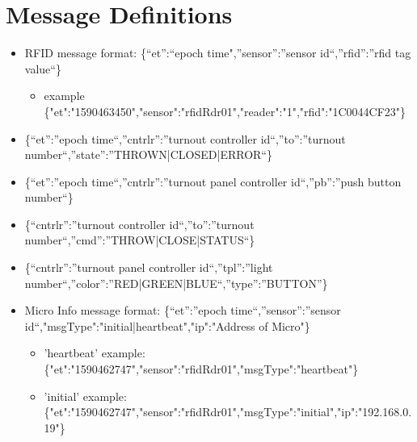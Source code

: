 \section{Message Definitions}
\begin{itemize}
\item \ac{RFID} message format: \{“et”:“epoch time",”sensor”:”sensor id“,”rfid”:”rfid tag value“\}
\begin{itemize}
\item example \{"et":"1590463450","sensor":"rfidRdr01","reader":"1","rfid":"1C0044CF23"\}
\end{itemize}
\item\{“et”:”epoch time“,”cntrlr”:”turnout controller id“,”to”:”turnout number“,”state”:”THROWN|CLOSED|ERROR“\}
\item\{“et”:”epoch time“,”cntrlr”:”turnout panel controller id“,”pb”:”push button number“\} 
\item\{“cntrlr”:”turnout controller id“,”to”:”turnout number“,”cmd”:”THROW|CLOSE|STATUS“\}
\item\{“cntrlr”:”turnout panel controller id“,”tpl”:”light number“,”color”:”RED|GREEN|BLUE“,”type”:”BUTTON”\}
\item Micro Info message format: \{“et”:”epoch time“,”sensor”:”sensor id“,"msgType":"initial|heartbeat","ip":"Address of Micro"\}
\begin{itemize}
\item 'heartbeat' example: \{"et":"1590462747","sensor":"rfidRdr01","msgType":"heartbeat"\} 
\item 'initial' example: \{"et":"1590462747","sensor":"rfidRdr01","msgType":"initial","ip":"192.168.0.19"\}
\end{itemize}
\end{itemize}
